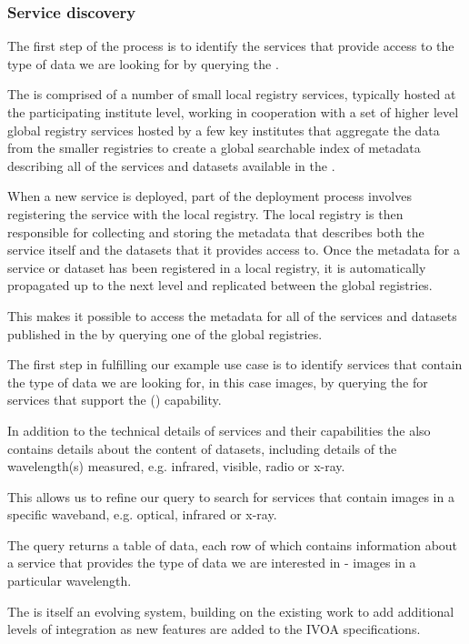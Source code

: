 \documentclass{article}
\begin{document}
\subsubsection{Service discovery}

The first step of the process is to identify the services that provide
access to the type of data we are looking for by querying the \cite{ivoa-reg}.

The \cite{ivoa-reg} is comprised of a number of small local registry
services, typically hosted at the participating institute level, working in
cooperation with a set of higher level global registry services hosted by a
few key institutes that aggregate the data from the smaller registries to
create a global searchable index of metadata describing all of the services
and datasets available in the \cite{vo}.

When a new service is deployed, part of the deployment process involves
registering the service with the local registry.
The local registry is then responsible for collecting and storing the
metadata that describes both the service itself and the datasets that it
provides access to.
Once the metadata for a service or dataset has been registered in a local
registry, it is automatically propagated up to the next level and replicated
between the global registries.

This makes it possible to access the metadata for all of the services
and datasets published in the \cite{vo} by querying one of the global
registries.

The first step in fulfilling our example use case is to identify services that
contain the type of data we are looking for, in this case images, by querying
the \cite{ivoa-reg} for services that support the 
(\cite{ivoa-sia}) capability.

In addition to the technical details of services and their capabilities
the \cite{ivoa-reg} also contains details about the content of datasets,
including details of the wavelength(s) measured, e.g. infrared, visible,
radio or x-ray.

This allows us to refine our query to search for \cite{ivoa-sia} services
that contain images in a specific waveband, e.g. optical, infrared or x-ray.

The \cite{ivoa-reg} query returns a table of data, each row of which contains
information about a \cite{ivoa-sia} service that provides the type of data
we are interested in - images in a particular wavelength.

The \cite{vo} is itself an evolving system, building on the existing work
to add additional levels of integration as new features are added to the
IVOA specifications.
\end{document}
